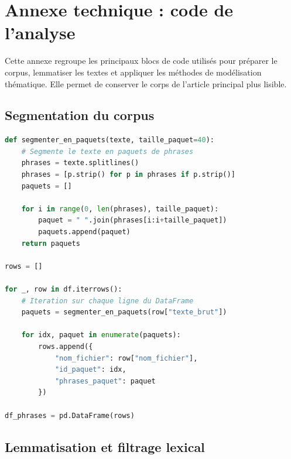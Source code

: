 % 

\section{Annexe technique : code de l'analyse}

Cette annexe regroupe les principaux blocs de code utilisés pour préparer le corpus, lemmatiser les textes et appliquer les méthodes de modélisation thématique. Elle permet de conserver le corps de l'article principal plus lisible.

\subsection{Segmentation du corpus}

\begin{lstlisting}[language=Python, caption={Code de segmentation du texte en paquets de phrases}]
def segmenter_en_paquets(texte, taille_paquet=40):
    # Segmente le texte en paquets de phrases
    phrases = texte.splitlines()
    phrases = [p.strip() for p in phrases if p.strip()]
    paquets = []

    for i in range(0, len(phrases), taille_paquet):
        paquet = " ".join(phrases[i:i+taille_paquet])
        paquets.append(paquet)
    return paquets

rows = []

for _, row in df.iterrows():
    # Iteration sur chaque ligne du DataFrame
    paquets = segmenter_en_paquets(row["texte_brut"])

    for idx, paquet in enumerate(paquets):
        rows.append({
            "nom_fichier": row["nom_fichier"],
            "id_paquet": idx,
            "phrases_paquet": paquet
        })

df_phrases = pd.DataFrame(rows)
\end{lstlisting}

\subsection{Lemmatisation et filtrage lexical}

